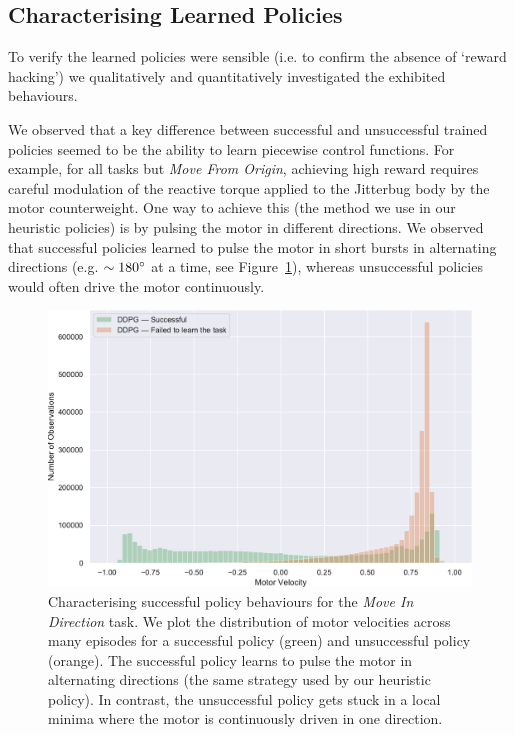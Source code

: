 \documentclass[letterpaper, 10 pt, conference]{ieeeconf}
\begin{document}
\subsection{Characterising Learned Policies}

To verify the learned policies were sensible (i.e. to confirm the absence of `reward hacking') we qualitatively and quantitatively investigated the exhibited behaviours.

We observed that a key difference between successful and unsuccessful trained policies seemed to be the ability to learn piecewise control functions.
For example, for all tasks but \emph{Move From Origin}, achieving high reward requires careful modulation of the reactive torque applied to the Jitterbug body by the motor counterweight.
One way to achieve this (the method we use in our heuristic policies) is by pulsing the motor in different directions.
We observed that successful policies learned to pulse the motor in short bursts in alternating directions (e.g. $\sim180\degree$ at a time, see Figure~\ref{fig:motor-hist}), whereas unsuccessful policies would often drive the motor continuously.

\begin{figure}[h]
    \centering
    \includegraphics[width=\linewidth]{fig-motor-hist}
    \caption{
        Characterising successful policy behaviours for the \emph{Move In Direction} task.
        We plot the distribution of motor velocities across many episodes for a successful policy (green) and unsuccessful policy (orange).
        The successful policy learns to pulse the motor in alternating directions (the same strategy used by our heuristic policy).
        In contrast, the unsuccessful policy gets stuck in a local minima where the motor is continuously driven in one direction.
    }
    \label{fig:motor-hist}
\end{figure}
\end{document}

